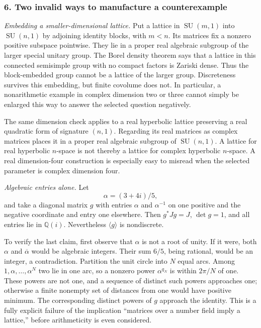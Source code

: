 \documentclass[11pt]{article}
\begin{document}
\subsubsection{6. Two invalid ways to manufacture a counterexample}
\emph{Embedding a smaller-dimensional lattice.} Put a lattice in $\operatorname{SU}(m,1)$ into $\operatorname{SU}(n,1)$ by adjoining identity blocks, with $m<n$. Its matrices fix a nonzero positive subspace pointwise. They lie in a proper real algebraic subgroup of the larger special unitary group. The Borel density theorem says that a lattice in this connected semisimple group with no compact factors is Zariski dense. Thus the block-embedded group cannot be a lattice of the larger group. Discreteness survives this embedding, but finite covolume does not. In particular, a nonarithmetic example in complex dimension two or three cannot simply be enlarged this way to answer the selected question negatively.

The same dimension check applies to a real hyperbolic lattice preserving a real quadratic form of signature $(n,1)$. Regarding its real matrices as complex matrices places it in a proper real algebraic subgroup of $\operatorname{SU}(n,1)$. A lattice for real hyperbolic $n$-space is not thereby a lattice for complex hyperbolic $n$-space. A real dimension-four construction is especially easy to misread when the selected parameter is complex dimension four.

\emph{Algebraic entries alone.} Let
\[
 \alpha=(3+4i)/5,
\]
and take a diagonal matrix $g$ with entries $\alpha$ and $\alpha^{-1}$ on one positive and the negative coordinate and entry one elsewhere. Then $g^*Jg=J$, $\det g=1$, and all entries lie in $\mathbb Q(i)$. Nevertheless $\langle g\rangle$ is nondiscrete.

To verify the last claim, first observe that $\alpha$ is not a root of unity. If it were, both $\alpha$ and $\overline\alpha$ would be algebraic integers. Their sum $6/5$, being rational, would be an integer, a contradiction. Partition the unit circle into $N$ equal arcs. Among $1,\alpha,\ldots,\alpha^N$ two lie in one arc, so a nonzero power $\alpha^{q_N}$ is within $2\pi/N$ of one. These powers are not one, and a sequence of distinct such powers approaches one; otherwise a finite nonempty set of distances from one would have positive minimum. The corresponding distinct powers of $g$ approach the identity. This is a fully explicit failure of the implication ``matrices over a number field imply a lattice,'' before arithmeticity is even considered.
\end{document}
